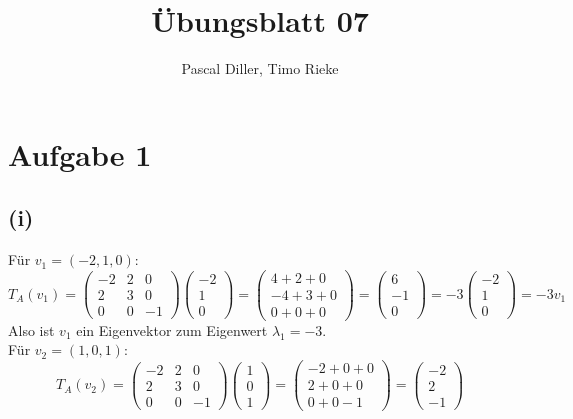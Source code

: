 \documentclass{article}
\title{Übungsblatt 07}
\author{Pascal Diller, Timo Rieke}
\begin{document}
\maketitle
\section*{Aufgabe 1}

\subsection*{(i)}
Für $v_1 = (-2, 1, 0)$:
\[T_A(v_1) = \begin{pmatrix} -2 & 2 & 0 \\ 2 & 3 & 0 \\ 0 & 0 & -1 \end{pmatrix} \begin{pmatrix} -2 \\ 1 \\ 0 \end{pmatrix} = \begin{pmatrix} 4 + 2 + 0 \\ -4 + 3 + 0 \\ 0 + 0 + 0 \end{pmatrix} = \begin{pmatrix} 6 \\ -1 \\ 0 \end{pmatrix} = -3 \begin{pmatrix} -2 \\ 1 \\ 0 \end{pmatrix} = -3v_1\] 
Also ist $v_1$ ein Eigenvektor zum Eigenwert $\lambda_1 = -3$. \\
Für $v_2 = (1, 0, 1)$:
\[T_A(v_2) = \begin{pmatrix} -2 & 2 & 0 \\ 2 & 3 & 0 \\ 0 & 0 & -1 \end{pmatrix} \begin{pmatrix} 1 \\ 0 \\ 1 \end{pmatrix} = \begin{pmatrix} -2 + 0 + 0 \\ 2 + 0 + 0 \\ 0 + 0 - 1 \end{pmatrix} = \begin{pmatrix} -2 \\ 2 \\ -1 \end{pmatrix}\]
\end{document}
